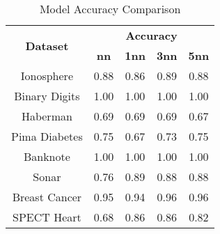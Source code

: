 \begin{table}[htbp]
\caption{Model Accuracy Comparison}
\begin{center}
\begin{tabular}{|c|c|c|c|c|}
\hline
\multirow{2}{*}{\textbf{Dataset}} & \multicolumn{4}{c|}{\textbf{Accuracy}} \\ \cline{2-5}
 & \textbf{nn} & \textbf{1nn} & \textbf{3nn} & \textbf{5nn} \\ \hline
Ionosphere & 0.88 & 0.86 & 0.89 & 0.88 \\ \hline
Binary Digits & 1.00 & 1.00 & 1.00 & 1.00 \\ \hline
Haberman & 0.69 & 0.69 & 0.69 & 0.67 \\ \hline
Pima Diabetes & 0.75 & 0.67 & 0.73 & 0.75 \\ \hline
Banknote & 1.00 & 1.00 & 1.00 & 1.00 \\ \hline
Sonar & 0.76 & 0.89 & 0.88 & 0.88 \\ \hline
Breast Cancer & 0.95 & 0.94 & 0.96 & 0.96 \\ \hline
SPECT Heart & 0.68 & 0.86 & 0.86 & 0.82 \\ \hline
\end{tabular}
\label{tab:accuracy}
\end{center}
\end{table}